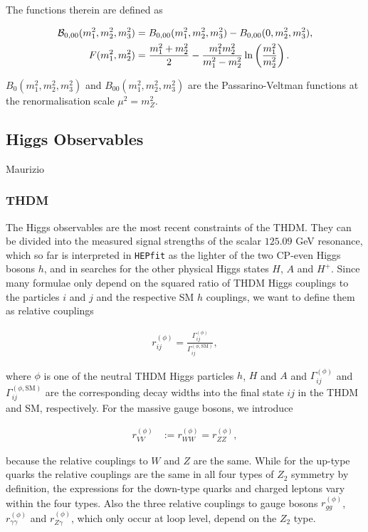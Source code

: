\documentclass[aps,superscriptaddress,nofootinbib,floatfix,notitlepage]{revtex4-1}
\newcommand{\HEPfit}{\texttt{HEPfit}\xspace}
\begin{document}
The functions therein are defined as

\begin{align}
 {\cal B}_{0,00}(m_1^2,m_2^2,m_3^2) &= B_{0,00}(m_1^2,m_2^2,m_3^2)-B_{0,00}(0,m_2^2,m_3^2), \nonumber \\
 F(m_1^2,m_2^2) &= \frac{m_1^2+m_2^2}{2} - \frac{m_1^2 m_2^2}{m_1^2-m_2^2} \ln \left( \frac{m_1^2}{m_2^2} \right) . \nonumber
\end{align}

$B_0(m_1^2,m_2^2,m_3^2)$ and $B_{00}(m_1^2,m_2^2,m_3^2)$ are the Passarino-Veltman functions at the renormalisation scale $\mu^2=m_Z^2$.

\subsection{Higgs Observables}
\label{sec:HSS}

Maurizio

\subsubsection{THDM}

The Higgs observables are the most recent constraints of the THDM. They can be divided into the measured signal strengths of the scalar $125.09$ GeV resonance, which so far is interpreted in \HEPfit as the lighter of the two CP-even Higgs bosons $h$, and in searches for the other physical Higgs states $H$, $A$ and $H^+$. Since many formulae only depend on the squared ratio of THDM Higgs couplings to the particles $i$ and $j$ and the respective SM $h$ couplings, we want to define them as relative couplings

\begin{align}
 r_{ij}^{(\phi)}=\frac{\Gamma_{ij}^{(\phi)}}{\Gamma_{ij}^{(\phi,\text{SM})}}, \nonumber
\end{align}

where $\phi$ is one of the neutral THDM Higgs particles $h$, $H$ and $A$ and $\Gamma_{ij}^{(\phi)}$ and $\Gamma_{ij}^{(\phi,\text{SM})}$ are the corresponding decay widths into the final state $ij$ in the THDM and SM, respectively. For the massive gauge bosons, we introduce

\begin{align}
 r_{VV}^{(\phi)}&:=r_{WW}^{(\phi)}=r_{ZZ}^{(\phi)}, \nonumber
\end{align}

because the relative couplings to $W$ and $Z$ are the same. While for the up-type quarks the relative couplings are the same in all four types of $Z_2$ symmetry by definition, the expressions for the down-type quarks and charged leptons vary within the four types. Also the three relative couplings to gauge bosons $r_{gg}^{(\phi)}$, $r_{\gamma \gamma}^{(\phi)}$ and $r_{Z\gamma}^{(\phi)}$, which only occur at loop level, depend on the $Z_2$ type.\\
\end{document}
